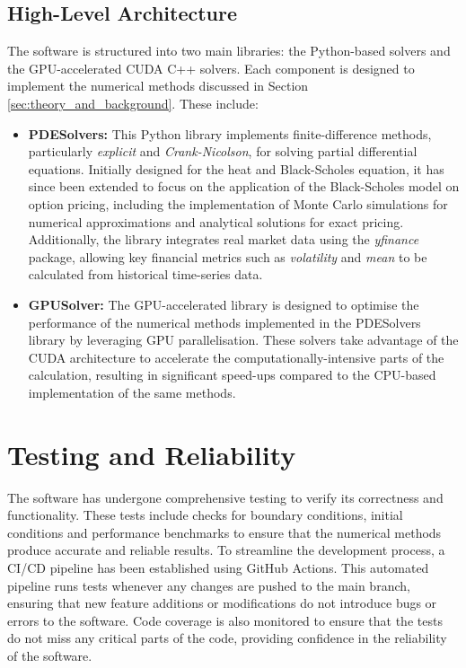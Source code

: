 \subsection{High-Level Architecture}
The software is structured into two main libraries: the Python-based solvers and the GPU-accelerated CUDA C++ solvers. Each component is designed to implement the numerical methods discussed in Section \ref{sec:theory_and_background}. These include:
\begin{itemize}
    \item \textbf{PDESolvers:} This Python library implements finite-difference methods, particularly \textit{explicit} and \textit{Crank-Nicolson}, for solving partial differential equations. Initially designed for the heat and Black-Scholes equation, it has since been extended to focus on the application of the Black-Scholes model on option pricing, including the implementation of Monte Carlo simulations for numerical approximations and analytical solutions for exact pricing. Additionally, the library integrates real market data using the \textit{yfinance} package, allowing key financial metrics such as \textit{volatility} and \textit{mean} to be calculated from historical time-series data. 
    \item \textbf{GPUSolver:} The GPU-accelerated library is designed to optimise the performance of the numerical methods implemented in the PDESolvers library by leveraging GPU parallelisation. These solvers take advantage of the CUDA architecture to accelerate the computationally-intensive parts of the calculation, resulting in significant speed-ups compared to the CPU-based implementation of the same methods.
\end{itemize}




\section{Testing and Reliability} \label{sec:software_testing}
The software has undergone comprehensive testing to verify its correctness and functionality. These tests include checks for boundary conditions, initial conditions and performance benchmarks to ensure that the numerical methods produce accurate and reliable results. To streamline the development process, a CI/CD pipeline has been established using GitHub Actions. This automated pipeline runs tests whenever any changes are pushed to the main branch, ensuring that new feature additions or modifications do not introduce bugs or errors to the software. Code coverage is also monitored to ensure that the tests do not miss any critical parts of the code, providing confidence in the reliability of the software.

